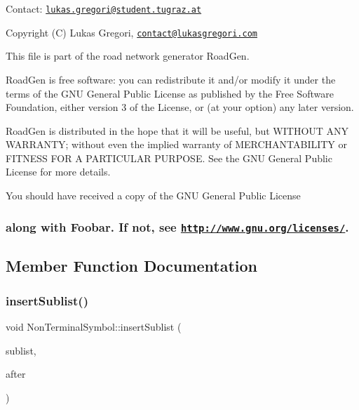 Contact\+: \href{mailto:lukas.gregori@student.tugraz.at}{\tt lukas.\+gregori@student.\+tugraz.\+at}



 Copyright (C) Lukas Gregori, \href{mailto:contact@lukasgregori.com}{\tt contact@lukasgregori.\+com}

This file is part of the road network generator Road\+Gen.

Road\+Gen is free software\+: you can redistribute it and/or modify it under the terms of the G\+NU General Public License as published by the Free Software Foundation, either version 3 of the License, or (at your option) any later version.

Road\+Gen is distributed in the hope that it will be useful, but W\+I\+T\+H\+O\+UT A\+NY W\+A\+R\+R\+A\+N\+TY; without even the implied warranty of M\+E\+R\+C\+H\+A\+N\+T\+A\+B\+I\+L\+I\+TY or F\+I\+T\+N\+E\+SS F\+OR A P\+A\+R\+T\+I\+C\+U\+L\+AR P\+U\+R\+P\+O\+SE. See the G\+NU General Public License for more details.

You should have received a copy of the G\+NU General Public License \subsubsection*{along with Foobar. If not, see \href{http://www.gnu.org/licenses/}{\tt http\+://www.\+gnu.\+org/licenses/}. }

\subsection{Member Function Documentation}
\hypertarget{class_non_terminal_symbol_a5836ba5450850843721742e40064c5dc}{}\label{class_non_terminal_symbol_a5836ba5450850843721742e40064c5dc} 
\subsubsection{\texorpdfstring{insert\+Sublist()}{insertSublist()}}
{\footnotesize\ttfamily void Non\+Terminal\+Symbol\+::insert\+Sublist (\begin{DoxyParamCaption}\item[{\hyperlink{class_non_terminal_symbol}{Non\+Terminal\+Symbol} $\ast$}]{sublist,  }\item[{\hyperlink{class_non_terminal_symbol}{Non\+Terminal\+Symbol} $\ast$}]{after }\end{DoxyParamCaption})}



